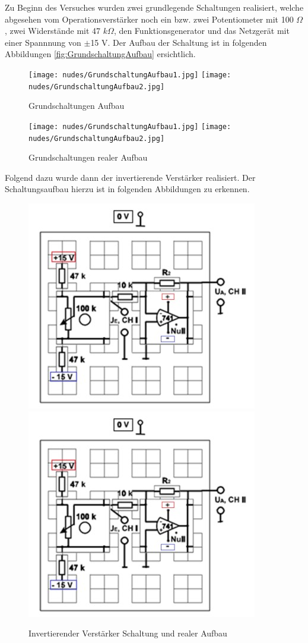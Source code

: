 \documentclass[12pt,a4paper,twoside]{article}
\begin{document}
Zu Beginn des Versuches wurden zwei grundlegende Schaltungen realisiert, welche abgesehen vom Operationsverstärker noch ein bzw. zwei Potentiometer mit 100 $\Omega$, zwei Widerstände mit 47 $k \Omega$, den Funktionsgenerator und das Netzgerät mit einer Spannnung von $\pm$15 V. Der Aufbau der Schaltung ist in folgenden Abbildungen \ref{fig:GrundschaltungAufbau} ersichtlich.

\begin{figure}[H]
    \centering
    \texttt{[image: nudes/GrundschaltungAufbau1.jpg]}
    \texttt{[image: nudes/GrundschaltungAufbau2.jpg]}
    \caption{Grundschaltungen Aufbau \cite{teachcenter2}}
    \label{fig:GrundschaltungenAufbau}
\end{figure}

\begin{figure}[H]
    \centering
    \texttt{[image: nudes/GrundschaltungAufbau1.jpg]}
    \texttt{[image: nudes/GrundschaltungAufbau2.jpg]}
    \caption{Grundschaltungen realer Aufbau}
    \label{fig:GrundschaltungenAufbauIRL}
\end{figure}

\noindent
Folgend dazu wurde dann der invertierende Verstärker realisiert. Der Schaltungsaufbau hierzu ist in folgenden Abbildungen zu erkennen.

\begin{figure}[H]
    \centering
    \includegraphics[width=0.4\linewidth]{nudes/InvertierenderVerstärkerSchaltungAufbau.jpg}
    \includegraphics[width=0.4\linewidth]{nudes/InvertierenderVerstärkerSchaltungAufbau.jpg}
    \caption{Invertierender Verstärker Schaltung und realer Aufbau \cite{teachcenter2}}
    \label{fig:SchaltungInvertierenderVerstärker}
\end{figure}
\end{document}
